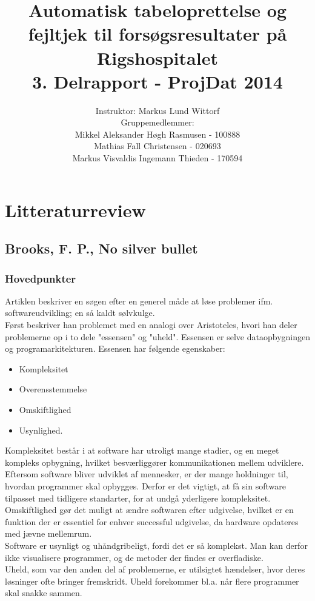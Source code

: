 \documentclass[11pt]{article}
\title{Automatisk tabeloprettelse og fejltjek til forsøgsresultater på Rigshospitalet\\
3. Delrapport - ProjDat 2014}
\author{Instruktor: Markus Lund Wittorf \\Gruppemedlemmer: \\ Mikkel Aleksander Høgh Rasmusen - 100888 \\ Mathias Fall Christensen - 020693 \\ Markus Visvaldis Ingemann Thieden - 170594}
\date{}
\begin{document}
\maketitle
\pagebreak
\tableofcontents
\pagebreak
\section{Litteraturreview}
\subsection{Brooks, F. P., No silver bullet}
\subsubsection{Hovedpunkter}
Artiklen beskriver en søgen efter en generel måde at løse problemer ifm. softwareudvikling; en så kaldt sølvkulge.\\
Først beskriver han problemet med en analogi over Aristoteles, hvori han deler problemerne op i to dele "essensen" og "uheld". Essensen er selve dataopbygningen og programarkitekturen. Essensen har følgende egenskaber:
\begin{itemize}
\item Kompleksitet
\item Overensstemmelse 
\item Omskiftlighed
\item Usynlighed.
\end{itemize}
Kompleksitet består i at software har utroligt mange stadier, og en meget kompleks opbygning, hvilket besværliggører kommunikationen mellem udviklere.\\
Eftersom software bliver udviklet af mennesker, er der mange holdninger til, hvordan programmer skal opbygges. Derfor er det vigtigt, at få sin software tilpasset med tidligere standarter, for at undgå yderligere kompleksitet.\\
Omskiftlighed gør det muligt at ændre softwaren efter udgivelse, hvilket er en funktion der er essentiel for enhver successful udgivelse, da hardware opdateres med jævne mellemrum.\\
Software er usynligt og uhåndgribeligt, fordi det er så komplekst. Man kan derfor ikke visualisere programmer, og de metoder der findes er overfladiske.\\
Uheld, som var den anden del af problemerne, er utilsigtet hændelser, hvor deres løsninger ofte bringer fremskridt. Uheld forekommer bl.a. når flere programmer skal snakke sammen.\\
\end{document}
